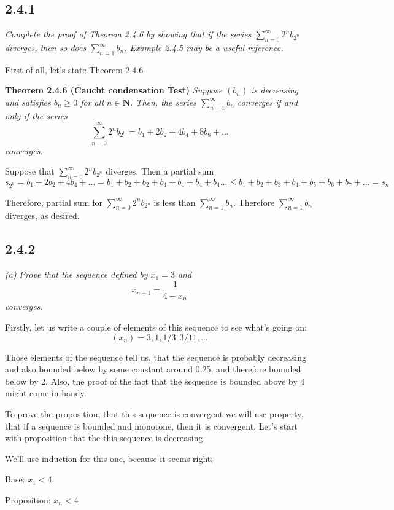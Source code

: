 \documentclass[11pt,oneside,titlepage]{book}
\begin{document}
\subsection*{2.4.1}
\textit{Complete the proof of Theorem 2.4.6 by showing that if the
  series $\sum^{\infty}_{n = 0} 2^n b_{2^n}$ diverges, then so does
  $\sum^{\infty}_{n = 1} b_n$. Example 2.4.5 may be a useful reference.}

First of all, let's state Theorem 2.4.6

\textbf{Theorem 2.4.6 (Caucht condensation Test)}
\textit{Suppose $(b_n)$ is decreasing and satisfies $b_n \geq 0$ for all
  $n \in \textbf{N}$. Then, the series $\sum_{n = 1}^{\infty}b_n$ converges
  if and only if the series }
$$\sum_{n = 0}^{\infty}2^n b_{2^n} = b_1 + 2 b_2 + 4 b_4 + 8 b_8 + ...$$
\textit{converges.}

Suppose that $\sum^{\infty}_{n = 0} 2^n b_{2^n}$ diverges. Then a partial
sum
$$s_{2^k} = b_1 + 2 b_2 + 4 b_4 + ... =
b_1 + b_2 + b_2 + b_4 + b_4 + b_4 + b_4 ... \leq
b_1 + b_2 + b_3 + b_4 + b_5 + b_6 + b_7 + ... = s_n $$

Therefore, partial sum for $\sum^{\infty}_{n = 0} 2^n b_{2^n}$ is less than
$\sum^{\infty}_{n = 1} b_n$. Therefore $\sum^{\infty}_{n = 1} b_n$ diverges,
as desired.

\subsection*{2.4.2}
\textit{(a) Prove that the sequence defined by $x_1 = 3$ and}
$$x_{n + 1} = \frac{1}{4 - x_n}$$
\textit{converges.}



Firstly, let us write a couple of elements of this sequence to see what's going on:
$$(x_n) = 3, 1, 1/3, 3/11, ...$$

Those elements of the sequence tell us, that the sequence is probably decreasing
and also bounded below by some constant around 0.25, and therefore bounded below
by 2. Also, the proof of the fact that the sequence is bounded above by 4 might
come in handy.

To prove the proposition, that this sequence  is convergent we will
use property, that if a sequence is bounded and monotone, then it is convergent.
Let's start with proposition that the this sequence is decreasing.

We'll use induction for this one, because it seems right;

Base: $x_1 < 4$.

Proposition: $x_n < 4$
\end{document}
